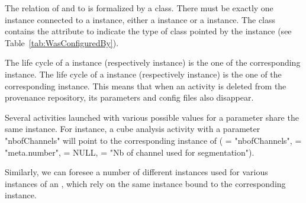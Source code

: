 The relation of  and  to  is formalized by a  class. There must be exactly one instance connected to a  instance, either a  instance or a  instance. The  class contains the attribute  to indicate the type of class pointed by the  instance (see Table~\ref{tab:WasConfiguredBy}).

The life cycle of a  instance (respectively  instance) is the one of the corresponding  instance. 
The life cycle of a  instance (respectively  instance) is the one of the corresponding  instance. 
This means that when an activity is deleted from the provenance repository, its parameters and config files also disappear.

Several activities launched with various possible values for a parameter share the same  instance. 
For instance, a cube analysis activity with a parameter "nbofChannels" will point to the corresponding instance of  ( = "nbofChannels",  = "meta.number",  = NULL,  = "Nb of channel used for segmentation"). 

Similarly, we can foresee a number of different  instances used for various instances of an , which rely on the same  instance bound to the corresponding  instance. 

